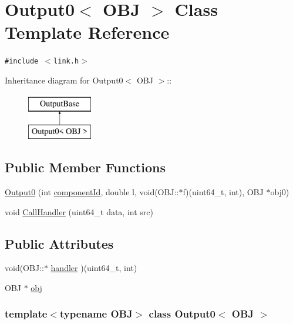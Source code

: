 \hypertarget{classOutput0}{
\section{Output0$<$ OBJ $>$ Class Template Reference}
\label{classOutput0}
}
{\tt \#include $<$link.h$>$}

Inheritance diagram for Output0$<$ OBJ $>$::\begin{figure}[H]
\begin{center}
\leavevmode
\includegraphics[height=2cm]{classOutput0}
\end{center}
\end{figure}
\subsection*{Public Member Functions}
\begin{CompactItemize}
\item 
\hyperlink{classOutput0_87632bde7780d0da8dc4fb19bf862d95}{Output0} (int \hyperlink{classOutputBase_93729601fb94bd561cb16ea2601d5528}{componentId}, double l, void(OBJ::$\ast$f)(uint64\_\-t, int), OBJ $\ast$obj0)
\item 
void \hyperlink{classOutput0_37e386a07fe2a033a847a39973458941}{CallHandler} (uint64\_\-t data, int src)
\end{CompactItemize}
\subsection*{Public Attributes}
\begin{CompactItemize}
\item 
void(OBJ::$\ast$ \hyperlink{classOutput0_3c30dd558372ba2fcbaa0748947b5161}{handler} )(uint64\_\-t, int)
\item 
OBJ $\ast$ \hyperlink{classOutput0_2dd51d5df9d69af8c45a0e7512cfbfec}{obj}
\end{CompactItemize}
\subsubsection*{template$<$typename OBJ$>$ class Output0$<$ OBJ $>$}



